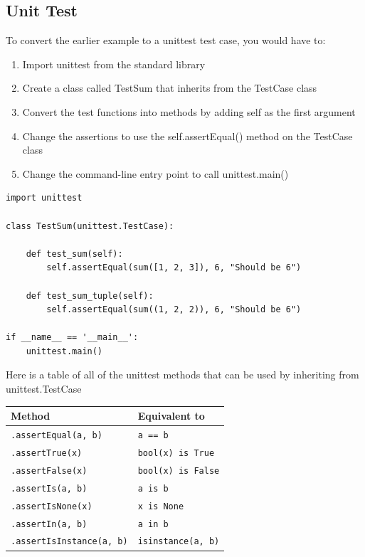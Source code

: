 \documentclass{report}
\begin{document}
    \pagebreak \bigbreak \noindent 
    \subsection{Unit Test}
    \bigbreak \noindent 
    To convert the earlier example to a unittest test case, you would have to:
    \begin{enumerate}
        \item Import unittest from the standard library
        \item Create a class called TestSum that inherits from the TestCase class
        \item Convert the test functions into methods by adding self as the first argument
        \item Change the assertions to use the self.assertEqual() method on the TestCase class
        \item Change the command-line entry point to call unittest.main()
    \end{enumerate}
    \bigbreak \noindent 
    \begin{verbatim}
import unittest

class TestSum(unittest.TestCase):

    def test_sum(self):
        self.assertEqual(sum([1, 2, 3]), 6, "Should be 6")

    def test_sum_tuple(self):
        self.assertEqual(sum((1, 2, 2)), 6, "Should be 6")

if __name__ == '__main__':
    unittest.main()
    \end{verbatim}

    \bigbreak \noindent 
    \begin{minipage}{0.47\textwidth}
        Here is a table of all of the unittest methods that can be used by inheriting from unittest.TestCase
    \bigbreak \noindent 
   \end{minipage}
   \begin{minipage}{0.47\textwidth}
        \begin{tabular}{|l|l|}
        \hline
        Method & Equivalent to \\
        \hline
        \texttt{.assertEqual(a, b)} & \texttt{a == b} \\
        \texttt{.assertTrue(x)} & \texttt{bool(x) is True} \\
        \texttt{.assertFalse(x)} & \texttt{bool(x) is False} \\
        \texttt{.assertIs(a, b)} & \texttt{a is b} \\
        \texttt{.assertIsNone(x)} & \texttt{x is None} \\
        \texttt{.assertIn(a, b)} & \texttt{a in b} \\
        \texttt{.assertIsInstance(a, b)} & \texttt{isinstance(a, b)} \\
        \hline
    \end{tabular}
   \end{minipage}
\end{document}
